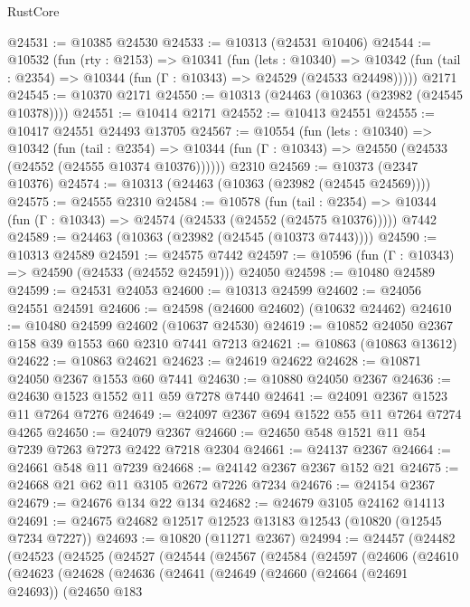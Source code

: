 \begin{lexlean}{RustCore}
\begin{coremodule}
@24531 := @10385 @24530
@24533 := @10313 (@24531 @10406)
@24544 := @10532
    (fun (rty : @2153) =>
    @10341
      (fun (lets : @10340) =>
      @10342 (fun (tail : @2354) => @10344 (fun (Γ : @10343) => @24529 (@24533 @24498)))))
    @2171
@24545 := @10370 @2171
@24550 := @10313 (@24463 (@10363 (@23982 (@24545 @10378))))
@24551 := @10414 @2171
@24552 := @10413 @24551
@24555 := @10417 @24551 @24493 @13705
@24567 := @10554
    (fun (lets : @10340) =>
    @10342
      (fun (tail : @2354) =>
      @10344 (fun (Γ : @10343) => @24550 (@24533 (@24552 (@24555 @10374 @10376))))))
    @2310
@24569 := @10373 (@2347 @10376)
@24574 := @10313 (@24463 (@10363 (@23982 (@24545 @24569))))
@24575 := @24555 @2310
@24584 := @10578
    (fun (tail : @2354) => @10344 (fun (Γ : @10343) => @24574 (@24533 (@24552 (@24575 @10376)))))
    @7442
@24589 := @24463 (@10363 (@23982 (@24545 (@10373 @7443))))
@24590 := @10313 @24589
@24591 := @24575 @7442
@24597 := @10596 (fun (Γ : @10343) => @24590 (@24533 (@24552 @24591))) @24050
@24598 := @10480 @24589
@24599 := @24531 @24053
@24600 := @10313 @24599
@24602 := @24056 @24551 @24591
@24606 := @24598 (@24600 @24602) (@10632 @24462)
@24610 := @10480 @24599 @24602 (@10637 @24530)
@24619 := @10852 @24050 @2367 @158 @39 @1553 @60 @2310 @7441 @7213
@24621 := @10863 (@10863 @13612)
@24622 := @10863 @24621
@24623 := @24619 @24622
@24628 := @10871 @24050 @2367 @1553 @60 @7441
@24630 := @10880 @24050 @2367
@24636 := @24630 @1523 @1552 @11 @59 @7278 @7440
@24641 := @24091 @2367 @1523 @11 @7264 @7276
@24649 := @24097 @2367 @694 @1522 @55 @11 @7264 @7274 @4265
@24650 := @24079 @2367
@24660 := @24650 @548 @1521 @11 @54 @7239 @7263 @7273 @2422 @7218 @2304
@24661 := @24137 @2367
@24664 := @24661 @548 @11 @7239
@24668 := @24142 @2367 @2367 @152 @21
@24675 := @24668 @21 @62 @11 @3105 @2672 @7226 @7234
@24676 := @24154 @2367
@24679 := @24676 @134 @22 @134
@24682 := @24679 @3105 @24162 @14113
@24691 := @24675 @24682 @12517 @12523 @13183 @12543 (@10820 (@12545 @7234 @7227))
@24693 := @10820 (@11271 @2367)
@24994 := @24457
    (@24482
      (@24523
        (@24525
          (@24527
            (@24544
              (@24567
                (@24584
                  (@24597
                    (@24606
                      (@24610
                        (@24623
                          (@24628
                            (@24636
                              (@24641
                                (@24649
                                  (@24660
                                    (@24664 (@24691 @24693))
                                    (@24650
                                      @183

\end{coremodule}
\end{lexlean}
